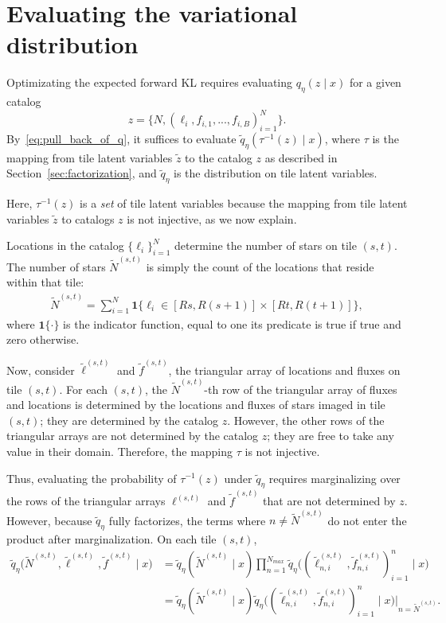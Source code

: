 \section{Evaluating the variational distribution}
\label{sec:eval_var_distr}

Optimizating the expected forward KL requires evaluating
$q_\eta(z \mid x)$ for a given catalog
\[z = \{N, (\ell_i, f_{i,1}, ..., f_{i,B})_{i = 1}^N\}.\]
By~\eqref{eq:pull_back_of_q}, 
it suffices to evaluate $\tilde q_\eta(\tau^{-1}(z) \mid x)$, 
where $\tau$ is the mapping from tile latent variables $\tilde z$ to the catalog $z$ as described in Section~\ref{sec:factorization}, 
and $\tilde q_\eta$ is the distribution on tile latent variables. 

Here, $\tau^{-1}(z)$ is a {\itshape set} of tile latent variables because the mapping from tile latent variables $\tilde z$ to catalogs $z$ is not injective, as we now explain.  

Locations in the catalog $\{\ell_i\}_{i=1}^N$
determine the number of stars on tile $(s,t)$. 
The number of stars $\tilde N^{(s,t)}$ is simply the count of the locations that reside within that tile:
\begin{align}
\tilde N^{(s,t)} = \sum_{i=1}^N 
\mathbf 1 \Big\{\ell_i\in [Rs, R(s+1)] \times [Rt, R(t+1)]\Big\},
\end{align}
where $\mathbf{1}\{\cdot\}$ is the indicator function, equal to one its predicate is true if true and zero otherwise.

Now, consider $\tilde\ell^{(s, t)}$ and $\tilde f^{(s, t)}$, the triangular array of locations and fluxes on tile $(s,t)$. 
For each $(s,t)$, the $\tilde N^{(s,t)}$-th row 
of the triangular array of fluxes and locations is
determined by the locations and fluxes of stars imaged in tile $(s,t)$; they are determined by the catalog $z$. However, the other rows 
of the triangular arrays are not determined by 
the catalog $z$; they are free to take any value in their domain. Therefore, the mapping $\tau$ is not injective. 

Thus, evaluating the probability of $\tau^{-1}(z)$ under $\tilde q_\eta$ requires marginalizing over the rows of the triangular arrays $\ell^{(s, t)}$ and $\tilde f^{(s, t)}$ that are not determined by $z$. However, 
because $\tilde q_\eta$ fully factorizes, the terms 
where $n \not= \tilde N^{(s,t)}$ do not enter the
product
after marginalization.
On each tile $(s,t)$,
\begin{align}
    \tilde q_\eta\big(\tilde N^{(s, t)}, \tilde \ell^{(s, t)}, \tilde f^{(s, t)} \mid x\big) &= 
    \tilde q_\eta(\tilde N^{(s,t)} \mid x) 
    \prod_{n = 1}^{N_{max}}
    \tilde q_\eta\big((\tilde \ell_{n,i}^{(s, t)}, 
    \tilde f_{n,i}^{(s, t)})_{i=1}^n \mid x\big) \\
    &= \tilde q_\eta(\tilde N^{(s,t)} \mid x) 
    \tilde q_\eta\big((\tilde \ell_{n,i}^{(s, t)}, 
    \tilde f_{n,i}^{(s, t)})_{i=1}^n \mid x\big)\Bigg|_{n = \tilde N^{(s,t)}}.
\end{align}

